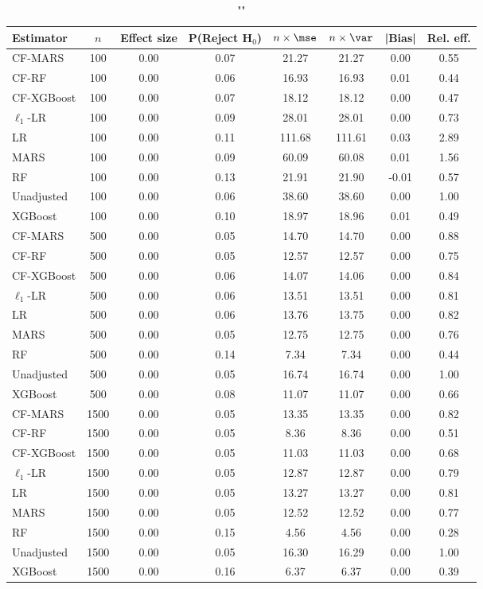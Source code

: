 \begin{table}
\centering
\caption{""}
\begin{tabular}{lccccccc}
\toprule
Estimator & $n$ & Effect size & P(Reject H$_0$) & $n\times\mse$ & $n\times \var$ & |Bias| & Rel. eff.\\ \midrule
CF-MARS & 100 & 0.00 & 0.07 &  21.27 &  21.27 &  0.00 & 0.55 \\ 
CF-RF & 100 & 0.00 & 0.06 &  16.93 &  16.93 &  0.01 & 0.44 \\ 
CF-XGBoost & 100 & 0.00 & 0.07 &  18.12 &  18.12 &  0.00 & 0.47 \\ 
$\ell_1$-LR & 100 & 0.00 & 0.09 &  28.01 &  28.01 &  0.00 & 0.73 \\ 
LR & 100 & 0.00 & 0.11 & 111.68 & 111.61 &  0.03 & 2.89 \\ 
MARS & 100 & 0.00 & 0.09 &  60.09 &  60.08 &  0.01 & 1.56 \\ 
RF & 100 & 0.00 & 0.13 &  21.91 &  21.90 & -0.01 & 0.57 \\ 
Unadjusted & 100 & 0.00 & 0.06 &  38.60 &  38.60 &  0.00 & 1.00 \\ 
XGBoost & 100 & 0.00 & 0.10 &  18.97 &  18.96 &  0.01 & 0.49 \\ \addlinespace 
CF-MARS & 500 & 0.00 & 0.05 &  14.70 &  14.70 &  0.00 & 0.88 \\ 
CF-RF & 500 & 0.00 & 0.05 &  12.57 &  12.57 &  0.00 & 0.75 \\ 
CF-XGBoost & 500 & 0.00 & 0.06 &  14.07 &  14.06 &  0.00 & 0.84 \\ 
$\ell_1$-LR & 500 & 0.00 & 0.06 &  13.51 &  13.51 &  0.00 & 0.81 \\ 
LR & 500 & 0.00 & 0.06 &  13.76 &  13.75 &  0.00 & 0.82 \\ 
MARS & 500 & 0.00 & 0.05 &  12.75 &  12.75 &  0.00 & 0.76 \\ 
RF & 500 & 0.00 & 0.14 &   7.34 &   7.34 &  0.00 & 0.44 \\ 
Unadjusted & 500 & 0.00 & 0.05 &  16.74 &  16.74 &  0.00 & 1.00 \\ 
XGBoost & 500 & 0.00 & 0.08 &  11.07 &  11.07 &  0.00 & 0.66 \\ \addlinespace 
CF-MARS & 1500 & 0.00 & 0.05 &  13.35 &  13.35 &  0.00 & 0.82 \\ 
CF-RF & 1500 & 0.00 & 0.05 &   8.36 &   8.36 &  0.00 & 0.51 \\ 
CF-XGBoost & 1500 & 0.00 & 0.05 &  11.03 &  11.03 &  0.00 & 0.68 \\ 
$\ell_1$-LR & 1500 & 0.00 & 0.05 &  12.87 &  12.87 &  0.00 & 0.79 \\ 
LR & 1500 & 0.00 & 0.05 &  13.27 &  13.27 &  0.00 & 0.81 \\ 
MARS & 1500 & 0.00 & 0.05 &  12.52 &  12.52 &  0.00 & 0.77 \\ 
RF & 1500 & 0.00 & 0.15 &   4.56 &   4.56 &  0.00 & 0.28 \\ 
Unadjusted & 1500 & 0.00 & 0.05 &  16.30 &  16.29 &  0.00 & 1.00 \\ 
XGBoost & 1500 & 0.00 & 0.16 &   6.37 &   6.37 &  0.00 & 0.39 \\
\bottomrule
\end{tabular}
\end{table}

